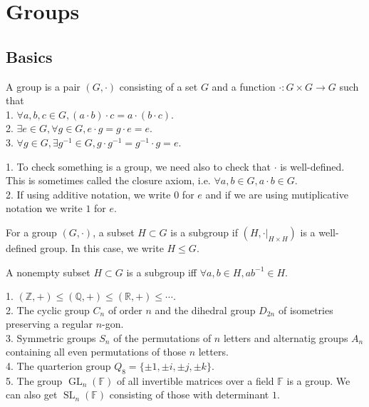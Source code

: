 \section{Groups}
\subsection{Basics}
\begin{definition}
    A group is a pair $(G,\cdot)$ consisting of a set $G$ and a function $\cdot:G\times G\to G$ such that\\
    1. $\forall a,b,c\in G,(a\cdot b)\cdot c=a\cdot(b\cdot c)$.\\
    2. $\exists e\in G,\forall g\in G,e\cdot g=g\cdot e=e$.\\
    3. $\forall g\in G,\exists g^{-1}\in G,g\cdot g^{-1}=g^{-1}\cdot g=e$.
\end{definition}
\begin{remark}
    1. To check something is a group, we need also to check that $\cdot$ is well-defined.
    This is sometimes called the closure axiom, i.e. $\forall a,b\in G, a\cdot b\in G$.\\
    2. If using additive notation, we write $0$ for $e$ and if we are using mutiplicative notation we write $1$ for $e$.
\end{remark}
\begin{definition}
    For a group $(G,\cdot)$, a subset $H\subset G$ is a subgroup if $(H,\cdot|_{H\times H})$ is a well-defined group.
    In this case, we write $H\le G$.
\end{definition}
\begin{remark}
    A nonempty subset $H\subset G$ is a subgroup iff $\forall a,b\in H,ab^{-1}\in H$.
\end{remark}
\begin{example}
    1. $(\mathbb Z,+)\le(\mathbb Q,+)\le(\mathbb R,+)\le\cdots$.\\
    2. The cyclic group $C_n$ of order $n$ and the dihedral group $D_{2n}$ of isometries preserving a regular $n$-gon.\\
    3. Symmetric groups $S_n$ of the permutations of $n$ letters and alternatig groups $A_n$ containing all even permutations of those $n$ letters.\\
    4. The quarterion group $Q_8=\{\pm 1,\pm i,\pm j,\pm k\}$.\\
    5. The group $\operatorname{GL}_n(\mathbb F)$ of all invertible matrices over a field $\mathbb F$ is a group.
    We can also get $\operatorname{SL}_n(\mathbb F)$ consisting of those with determinant $1$.
\end{example}
